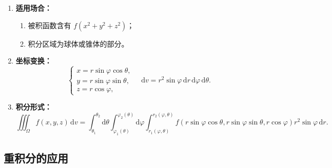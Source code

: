 \begin{enumerate}
      \item \textbf{适用场合：}
            \begin{enumerate}
                  \item 被积函数含有 $f(x^2 + y^2 + z^2)$；
                  \item 积分区域为球体或锥体的部分。
            \end{enumerate}
      \item \textbf{坐标变换：}
            \[
                  \begin{cases}
                        x = r\sin\varphi\cos\theta, \\
                        y = r\sin\varphi\sin\theta, \\
                        z = r\cos\varphi,
                  \end{cases}
                  \quad
                  \mathrm{d}v = r^2 \sin\varphi\, \mathrm{d}r\, \mathrm{d}\varphi\, \mathrm{d}\theta.
            \]
      \item \textbf{积分形式：}
            \[
                  \iiint_{\Omega} f(x,y,z)\, \mathrm{d}v
                  = \int_{\theta_1}^{\theta_2} \!\mathrm{d}\theta
                  \int_{\varphi_1(\theta)}^{\varphi_2(\theta)} \!\mathrm{d}\varphi
                  \int_{r_1(\varphi,\theta)}^{r_2(\varphi,\theta)}\!
                  f(r\sin\varphi\cos\theta, r\sin\varphi\sin\theta, r\cos\varphi)
                  r^2 \sin\varphi\, \mathrm{d}r.
            \]
\end{enumerate}
\subsection{重积分的应用}

